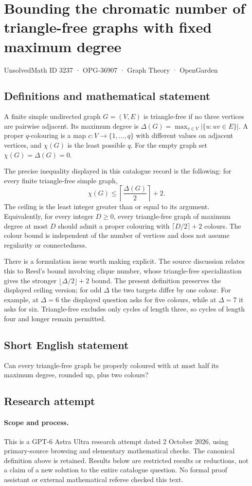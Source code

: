 \documentclass[11pt,a4paper]{article}
\begin{document}
\section*{Bounding the chromatic number of triangle-free graphs with fixed maximum degree}\label{3237}
{\small UnsolvedMath ID 3237 · OPG-36907 · Graph Theory · OpenGarden}
\subsection{Definitions and mathematical statement}
A finite simple undirected graph $G=(V,E)$ is triangle-free if no three
vertices are pairwise adjacent. Its maximum degree is
$\Delta(G)=\max_{v\in V}|\{u:uv\in E\}|$. A proper $q$-colouring is a map
$c:V\to\{1,\ldots,q\}$ with different values on adjacent vertices, and
$\chi(G)$ is the least possible $q$. For the empty graph set
$\chi(G)=\Delta(G)=0$.

The precise inequality displayed in this catalogue record is the following:
for every finite triangle-free simple graph,
\[
                \chi(G)\le\left\lceil\frac{\Delta(G)}2\right\rceil+2.
\]
The ceiling is the least integer greater than or equal to its argument.
Equivalently, for every integer $D\ge0$, every triangle-free graph of
maximum degree at most $D$ should admit a proper colouring with
$\lceil D/2\rceil+2$ colours. The colour bound is independent of the number
of vertices and does not assume regularity or connectedness.

There is a formulation issue worth making explicit. The source discussion
relates this to Reed's bound involving clique number, whose triangle-free
specialization gives the stronger $\lfloor\Delta/2\rfloor+2$ bound. The
present definition preserves the displayed ceiling version; for odd
$\Delta$ the two targets differ by one colour. For example, at $\Delta=6$
the displayed question asks for five colours, while at $\Delta=7$ it asks
for six. Triangle-free excludes only cycles of length three, so cycles of
length four and longer remain permitted.
\subsection{Short English statement}
Can every triangle-free graph be properly coloured with at most half its maximum degree, rounded up, plus two colours?
\subsection{Research attempt}
\paragraph{Scope and process.}
This is a GPT-6 Astra Ultra research attempt dated 2 October 2026, using
primary-source browsing and elementary mathematical checks. The canonical
definition above is retained. Results below are restricted results or
reductions, not a claim of a new solution to the entire catalogue question.
No formal proof assistant or external mathematical referee checked this text.
\end{document}

